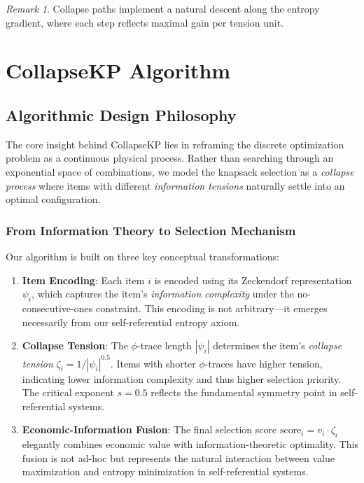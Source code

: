 \documentclass[11pt]{article}
\theoremstyle{remark}
\newtheorem{remark}{Remark}
\theoremstyle{definition}
\begin{document}
\begin{remark}
Collapse paths implement a natural descent along the entropy gradient, where each step reflects maximal gain per tension unit.
\end{remark}


\section{CollapseKP Algorithm}

\subsection{Algorithmic Design Philosophy}

The core insight behind CollapseKP lies in reframing the discrete optimization problem as a continuous physical process. Rather than searching through an exponential space of combinations, we model the knapsack selection as a \emph{collapse process} where items with different \emph{information tensions} naturally settle into an optimal configuration.

\subsubsection{From Information Theory to Selection Mechanism}

Our algorithm is built on three key conceptual transformations:

\begin{enumerate}
\item \textbf{Item Encoding}: Each item $i$ is encoded using its Zeckendorf representation $\psi_i$, which captures the item's \emph{information complexity} under the no-consecutive-ones constraint. This encoding is not arbitrary—it emerges necessarily from our self-referential entropy axiom.

\item \textbf{Collapse Tension}: The $\phi$-trace length $|\psi_i|$ determines the item's \emph{collapse tension} $\zeta_i = 1/|\psi_i|^{0.5}$. Items with shorter $\phi$-traces have higher tension, indicating lower information complexity and thus higher selection priority. The critical exponent $s = 0.5$ reflects the fundamental symmetry point in self-referential systems.

\item \textbf{Economic-Information Fusion}: The final selection score $\text{score}_i = v_i \cdot \zeta_i$ elegantly combines economic value with information-theoretic optimality. This fusion is not ad-hoc but represents the natural interaction between value maximization and entropy minimization in self-referential systems.
\end{enumerate}
\end{document}
